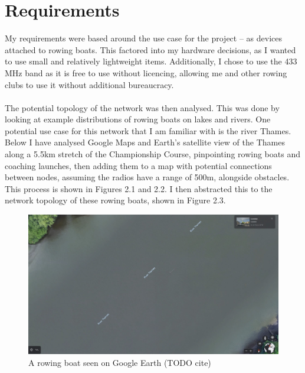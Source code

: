 \documentclass[12pt,a4paper]{report}
\begin{document}
\section{Requirements}
My requirements were based around the use case for the project -- as devices attached to rowing boats. This factored into my hardware decisions, as I wanted to use small and relatively lightweight items. Additionally, I chose to use the 433 MHz band as it is free to use without licencing, allowing me and other rowing clubs to use it without additional bureaucracy. \\ \\ 
The potential topology of the network was then analysed. This was done by looking at example distributions of rowing boats on lakes and rivers. One potential use case for this network that I am familiar with is the river Thames. Below I have analysed Google Maps and Earth's satellite view of the Thames along a 5.5km stretch of the Championship Course, pinpointing rowing boats and coaching launches, then adding them to a map with potential connections between nodes, assuming the radios have a range of 500m, alongside obstacles. This process is shown in Figures 2.1 and 2.2. I then abstracted this to the network topology of these rowing boats, shown in Figure 2.3.
\begin{figure}[h]
\caption{A rowing boat seen on Google Earth (TODO cite)}
\begin{center}
\includegraphics[scale=0.2]{earthSculler.jpg}
\end{center}
\end{figure}
\end{document}
